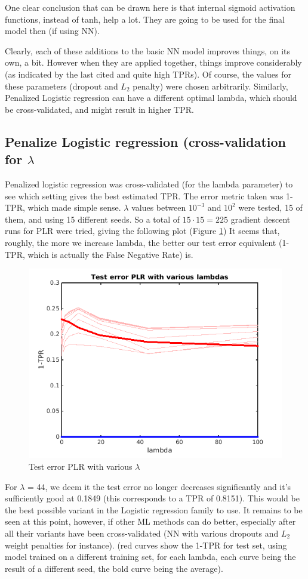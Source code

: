 \documentclass{article} %
\begin{document}
One clear conclusion that can be drawn here is that internal sigmoid activation functions, instead of tanh, help a lot. They are going to be used for the final model then (if using NN).

Clearly, each of these additions to the basic NN model improves things, on its own, a bit. However when they are applied together, things improve considerably (as indicated by the last cited and quite high TPRs). Of course, the values for these parameters (dropout and $L_2$ penalty) were chosen arbitrarily. Similarly, Penalized Logistic regression can have a different optimal lambda, which should be cross-validated, and might result in higher TPR. 

\subsection{Penalize Logistic regression (cross-validation for $\lambda$}
Penalized logistic regression was cross-validated (for the lambda parameter) to see which setting gives the best estimated TPR. The error metric taken was 1-TPR, which made simple sense. $\lambda$ values between $10^{-3}$ and $10^2$ were tested, 15 of them, and using 15 different seeds. So a total of $15 \cdot 15=225$ gradient descent runs for PLR were tried, giving the following plot (Figure \ref{fig:TEPLR})
It seems that, roughly, the more we increase lambda, the better our test error equivalent (1-TPR, which is actually the False Negative Rate) is.
\begin{figure}[h!]
\centering
\includegraphics[scale=0.6]{images/PLRKCVplot.png}
\caption{Test error PLR with various $\lambda$}
\label{fig:TEPLR}
\end{figure} For $\lambda$ = 44, we deem it the test error no longer decreases significantly and it’s sufficiently good at 0.1849 (this corresponds to a TPR of 0.8151). This would be the best possible variant in the Logistic regression family to use. It remains to be seen at this point, however, if other ML methods can do better, especially after all their variants have been cross-validated (NN with various dropouts and $L_2$ weight penalties for instance). (red curves show the 1-TPR for test set, using model trained on a different training set, for each lambda, each curve being the result of a different seed, the bold curve being the average).
\end{document}
